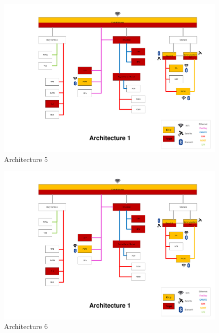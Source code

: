 \begin{figure}[h]
    \centering
    \includegraphics[width=\textwidth, page=5]{../Architectures-survey.pdf}
    \caption{Architecture 5}
    \label{fig:architecture5}
\end{figure}

\begin{figure}[h]
    \centering
    \includegraphics[width=\textwidth, page=6]{../Architectures-survey.pdf}
    \caption{Architecture 6}
    \label{fig:architecture6}
\end{figure}

